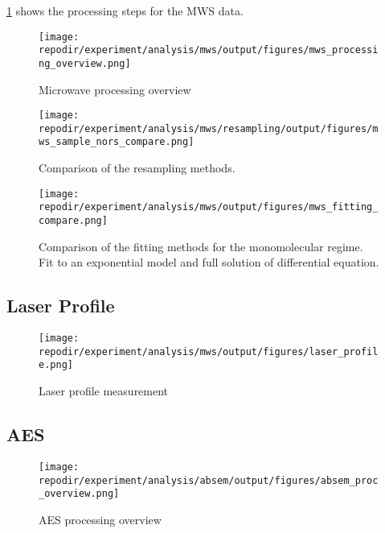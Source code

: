 \ref{fig:SI_mws_processing_overview} shows the processing steps for the MWS data. 



\begin{figure}[]
\centering
\texttt{[image: \\repodir/experiment/analysis/mws/output/figures/mws\_processing\_overview.png]}
\caption{Microwave processing overview}
\label{fig:SI_mws_processing_overview}
\end{figure}

\begin{figure}
\centering
\texttt{[image: \\repodir/experiment/analysis/mws/resampling/output/figures/mws\_sample\_nors\_compare.png]}
\caption{Comparison of the resampling methods.}
\label{fig:SI_mws_resampling}
\end{figure}


\begin{figure}
\centering
\texttt{[image: \\repodir/experiment/analysis/mws/output/figures/mws\_fitting\_compare.png]}
\caption{Comparison of the fitting methods for the monomolecular regime. Fit to an exponential model and full solution of differential equation. }
\label{fig:SI_mws_fitting_compare}
\end{figure}

\subsection{Laser Profile}


\begin{figure}[]
\centering
\texttt{[image: \\repodir/experiment/analysis/mws/output/figures/laser\_profile.png]}
\caption{Laser profile measurement}
\label{fig:SI_Laser_Profile}
\end{figure}

\subsection{AES}
\begin{figure}[]
    \centering
    \texttt{[image: \\repodir/experiment/analysis/absem/output/figures/absem\_proc\_overview.png]}
    \caption{AES processing overview}
    \label{fig:SI_AES_proc_overview}
\end{figure}
